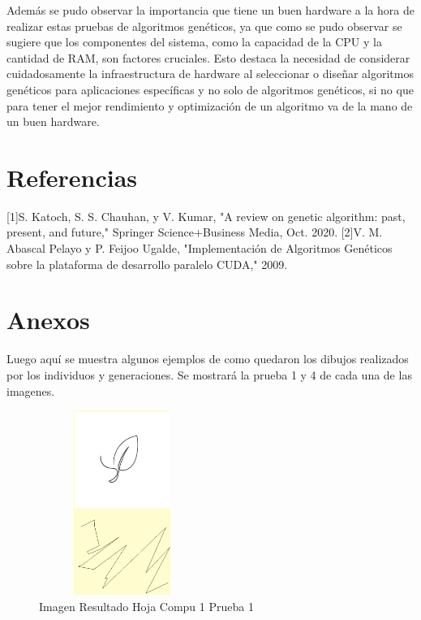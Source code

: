 \documentclass[conference]{IEEEtran}
\begin{document}
Además se pudo observar la importancia que tiene un buen hardware a la hora de realizar estas pruebas de algoritmos genéticos, ya que como se pudo observar se sugiere que los componentes del sistema, como la capacidad de la CPU y la cantidad de RAM, son factores cruciales. Esto destaca la necesidad de considerar cuidadosamente la infraestructura de hardware al seleccionar o diseñar algoritmos genéticos para aplicaciones específicas y no solo de algoritmos genéticos, si no que para tener el mejor rendimiento y optimización de un algoritmo va de la mano de un buen hardware. 

\section {Referencias}




 [1]S. Katoch, S. S. Chauhan, y V. Kumar, "A review on genetic algorithm: past, present, and future," Springer Science+Business Media, Oct. 2020.
[2]V. M. Abascal Pelayo y P. Feijoo Ugalde, "Implementación de Algoritmos Genéticos sobre la plataforma de desarrollo paralelo CUDA," 2009.

\vspace{12pt}


\section {Anexos}


Luego aquí se muestra algunos ejemplos de como quedaron los dibujos realizados por los individuos y generaciones. Se mostrará la prueba 1 y 4 de cada una de las imagenes. 

\begin{figure}[h]
    \centering
    \includegraphics[width=0.480\textwidth, height=6cm]{COMPU 1 HOJA-1.png} 
    \caption{Imagen Resultado Hoja Compu 1 Prueba 1}
    \label{fig:mi_imagen}
\end{figure}
\end{document}
